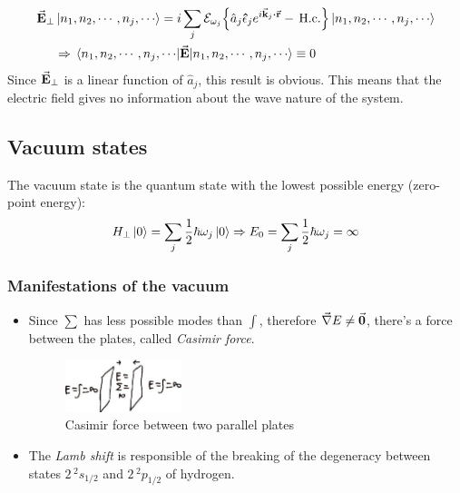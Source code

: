 \begin{align*}
	\trn{\va{E}} &\ket{n_{1}, n_{2}, \cdots, n_{j}, \cdots} = i \sum_{j} \mc{E}_{\omega_{j}} \qty{\hat{a}_{j} \vu{\epsilon}_{j} e^{i \va{k}_{j} \vdot \va{r}} - \Hc} \ket{n_{1}, n_{2}, \cdots, n_{j}, \cdots} \\
	& \Rightarrow \ev{{\va{E}}}{n_{1}, n_{2}, \cdots, n_{j}, \cdots} \equiv 0
\end{align*}
Since ${\va{E}}_{\perp}$ is a linear function of $\hat{a}_{j}$, this result is obvious. This means that the electric field gives no information about the wave nature of the system.

\subsection{Vacuum states}
\begin{defi}
	The vacuum state is the quantum state with the lowest possible energy (zero-point energy):
	\begin{align}
		{H}_{\perp} \ket{0} = \sum_{j} \frac{1}{2} \hbar \omega_{j} \ket{0} \Rightarrow E_{0} = \sum_{j} \frac{1}{2} \hbar \omega_{j} = \infty
	\end{align}
\end{defi}

\subsubsection*{Manifestations of the vacuum}
\begin{itemize}
	\item Since $\sum$ has less possible modes than $\int$, therefore $\vec{\nabla} E \neq \va{0}$, there's a force between the plates, called \emph{Casimir force}.
	\begin{figure}[H]
		\centering
		\includegraphics[width=0.32\textwidth]{./images/4-casimir}
		\caption{Casimir force between two parallel plates}
		\label{fig:casimir}
	\end{figure}
	\item The \emph{Lamb shift} is responsible of the breaking of the degeneracy between states $2 \, ^{2}s_{1/2}$ and $2 \, ^{2}p_{1/2}$ of hydrogen.
\end{itemize}

